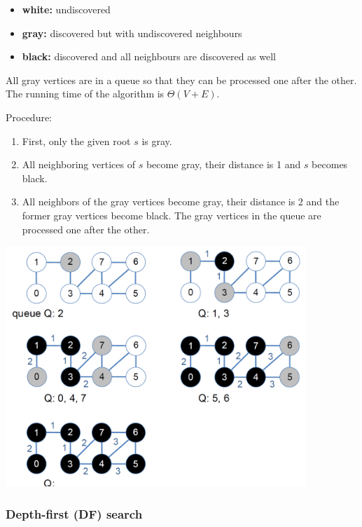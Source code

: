 \begin{itemize}
    \item \textbf{white:} undiscovered
    \item \textbf{gray:} discovered but with undiscovered neighbours
    \item \textbf{black:} discovered and all neighbours are discovered as well
\end{itemize}

All gray vertices are in a queue so that they can be processed one after the other. The running time of the algorithm is $\Theta(V+E)$.

Procedure:
\begin{enumerate}
    \item First, only the given root $s$ is gray.
    \item All neighboring vertices of $s$ become gray, their distance is 1 and $s$ becomes black.
    \item All neighbors of the gray vertices become gray, their distance is 2 and the former gray vertices become black. The gray vertices in the queue are processed one after the other.
\end{enumerate}

\begin{center}\includegraphics[width=0.85\textwidth]{img/graphs/BfSearch.png}\end{center}



\subsubsection{Depth-first (DF) search}

